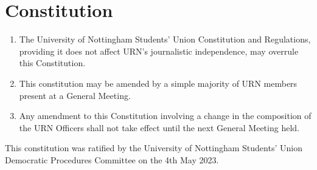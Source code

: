 \section{Constitution}

\begin{enumerate}[label*=\thesection.\arabic*.]
    \item The University of Nottingham Students' Union Constitution and Regulations, providing it does not affect URN's journalistic independence, may overrule this Constitution.
    \item This constitution may be amended by a simple majority of URN members present at a General Meeting.
    \item Any amendment to this Constitution involving a change in the composition of the URN Officers shall not take effect until the next General Meeting held.
\end{enumerate}

\bigbreak

This constitution was ratified by the University of Nottingham Students' Union Democratic Procedures Committee on the 4th May 2023.